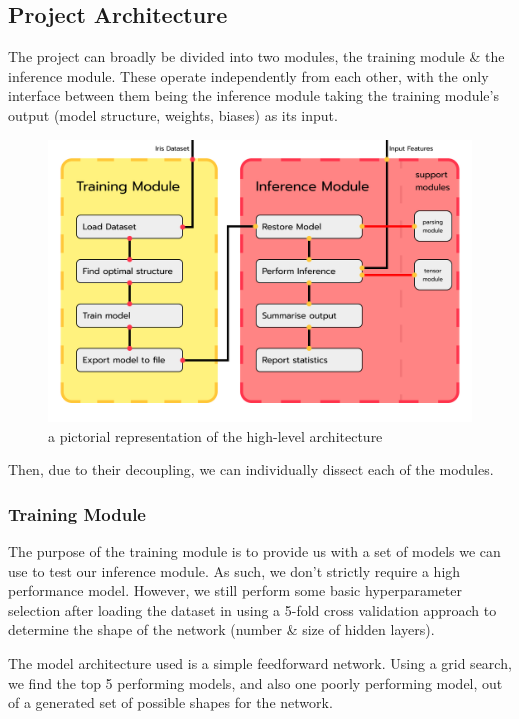 \documentclass[12pt]{article}
\begin{document}
\subsection{Project Architecture}
The project can broadly be divided into two modules, the training module \& the inference module. These operate independently from each other, with the only interface between them being the inference module taking the training module's output (model structure, weights, biases) as its input.

\newpage
\begin{figure}
	\includegraphics[width=0.85\pdfpagewidth]{../images/modules.png}
	\caption{a pictorial representation of the high-level architecture}
\end{figure}

Then, due to their decoupling, we can individually dissect each of the modules.

\subsubsection{Training Module}
The purpose of the training module is to provide us with a set of models we can use to test our inference module. As such, we don't strictly require a high performance model. However, we still perform some basic hyperparameter selection after loading the dataset in using a 5-fold cross validation approach to determine the shape of the network (number \& size of hidden layers).\bigskip

The model architecture used is a simple feedforward network. Using a grid search, we find the top 5 performing models, and also one poorly performing model, out of a generated set of possible shapes for the network.\bigskip
\end{document}
